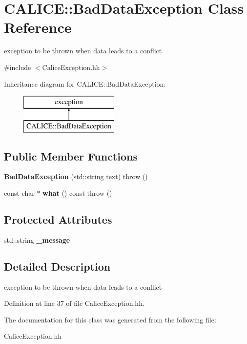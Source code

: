\section{C\-A\-L\-I\-C\-E\-:\-:Bad\-Data\-Exception Class Reference}
\label{classCALICE_1_1BadDataException}


exception to be thrown when data leads to a conflict  




{\ttfamily \#include $<$Calice\-Exception.\-hh$>$}

Inheritance diagram for C\-A\-L\-I\-C\-E\-:\-:Bad\-Data\-Exception\-:\begin{figure}[H]
\begin{center}
\leavevmode
\includegraphics[height=2.000000cm]{classCALICE_1_1BadDataException}
\end{center}
\end{figure}
\subsection*{Public Member Functions}
\begin{DoxyCompactItemize}
\item 
{\bfseries Bad\-Data\-Exception} (std\-::string text)  throw ()\label{classCALICE_1_1BadDataException_a765bc2673e0be6a8371b058b3fbe4a4e}

\item 
const char $\ast$ {\bfseries what} () const   throw ()\label{classCALICE_1_1BadDataException_aee526e91ff2f998e8420baac9c070546}

\end{DoxyCompactItemize}
\subsection*{Protected Attributes}
\begin{DoxyCompactItemize}
\item 
std\-::string {\bfseries \-\_\-message}\label{classCALICE_1_1BadDataException_aca1e20b6d7f88c0cd5dbacb38b462386}

\end{DoxyCompactItemize}


\subsection{Detailed Description}
exception to be thrown when data leads to a conflict 



Definition at line 37 of file Calice\-Exception.\-hh.



The documentation for this class was generated from the following file\-:\begin{DoxyCompactItemize}
\item 
Calice\-Exception.\-hh\end{DoxyCompactItemize}
